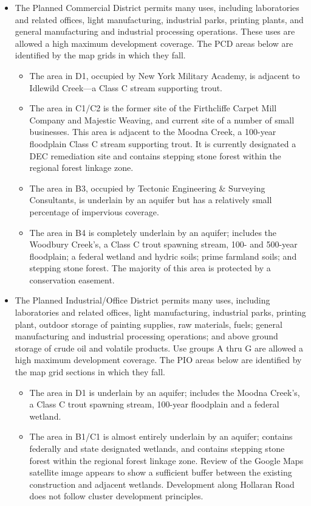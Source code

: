 \begin{itemize}
    \item The Planned Commercial District permits many uses, including laboratories and related offices, light manufacturing, industrial parks, printing plants, and general manufacturing and industrial processing operations. These uses are allowed a high maximum development coverage.  The PCD areas below are identified by the map grids in which they fall.
    \begin{itemize}
        \item The area in D1, occupied by New York Military Academy, is adjacent to Idlewild Creek—a Class C stream supporting trout.
        \item The area in C1/C2 is the former site of the Firthcliffe Carpet Mill Company and Majestic Weaving, and current site of a number of small businesses. This area is adjacent to the Moodna Creek, a 100-year floodplain Class C stream supporting trout. It is currently designated a DEC remediation site and contains stepping stone forest within the regional forest linkage zone.
        \item The area in B3, occupied by Tectonic Engineering \& Surveying Consultants, is underlain by an aquifer but has a relatively small percentage of impervious coverage.
        \item The area in B4 is completely underlain by an aquifer; includes the Woodbury Creek’s, a Class C trout spawning stream, 100- and 500-year floodplain; a federal wetland and hydric soils; prime farmland soils; and stepping stone forest.  The majority of this area is protected by a conservation easement.
        \end{itemize}
    \item The Planned Industrial/Office District permits many uses, including laboratories and related offices, light manufacturing, industrial parks, printing plant, outdoor storage of painting supplies, raw materials, fuels; general manufacturing and industrial processing operations; and above ground storage of crude oil and volatile products.  Use groups A thru G are allowed a high maximum development coverage.  The PIO areas below are identified by the map grid sections in which they fall.
    \begin{itemize}
        \item The area in D1 is underlain by an aquifer; includes the Moodna Creek’s, a Class C trout spawning stream, 100-year floodplain and a federal wetland.
        \item The area in B1/C1 is almost entirely underlain by an aquifer; contains federally and state designated wetlands, and contains stepping stone forest within the regional forest linkage zone.  Review of the Google Maps satellite image appears to show a sufficient buffer between the existing construction and adjacent wetlands. Development along Hollaran Road does not follow cluster development principles.

\end{itemize}
\end{itemize}
